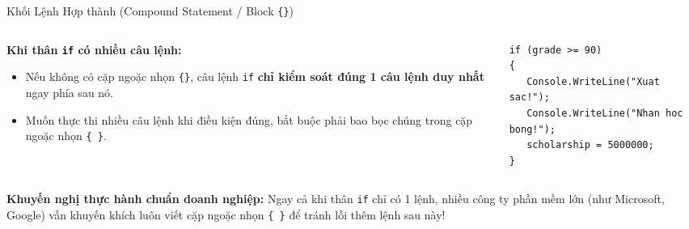 \documentclass[aspectratio=169, 10pt]{beamer}
\begin{document}
\begin{frame}[fragile]{Khối Lệnh Hợp thành (Compound Statement / Block \texttt{\{\}})}
  \begin{columns}[T]
    \begin{column}{0.48\textwidth}
      \begin{block}{\textbf{Khi thân \texttt{if} có nhiều câu lệnh:}}
        \begin{itemize}\small
          \item Nếu không có cặp ngoặc nhọn \texttt{\{\}}, câu lệnh \texttt{if} \textbf{chỉ kiểm soát đúng 1 câu lệnh duy nhất} ngay phía sau nó.
          \item Muốn thực thi nhiều câu lệnh khi điều kiện đúng, bắt buộc phải bao bọc chúng trong cặp ngoặc nhọn \texttt{\{ \}}.
        \end{itemize}
      \end{block}
    \end{column}

    \begin{column}{0.48\textwidth}
      \begin{tcolorbox}[colback=CodeBg,colframe=UniBlue,title=\textbf{Mã nguồn dùng khối lệnh \texttt{\{\}}},fonttitle=\small\bfseries]
\begin{lstlisting}
if (grade >= 90)
{
   Console.WriteLine("Xuat sac!");
   Console.WriteLine("Nhan hoc bong!");
   scholarship = 5000000;
}
\end{lstlisting}
      \end{tcolorbox}
    \end{column}
  \end{columns}
  \vspace{2mm}
  \begin{exampleblock}{\textbf{Khuyến nghị thực hành chuẩn doanh nghiệp:}}
    Ngay cả khi thân \texttt{if} chỉ có 1 lệnh, nhiều công ty phần mềm lớn (như Microsoft, Google) vẫn khuyến khích luôn viết cặp ngoặc nhọn \texttt{\{ \}} để tránh lỗi thêm lệnh sau này!
  \end{exampleblock}
\end{frame}
\end{document}
